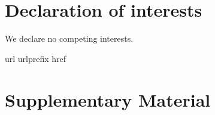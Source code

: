\documentclass[preprint,10pt]{elsarticle} %
\newcommand{\beginsupplement}{%
        \setcounter{table}{0}
        \renewcommand{\thetable}{S\arabic{table}}%
        \setcounter{figure}{0}
        \renewcommand{\thefigure}{S\arabic{figure}}%
     }
\begin{document}
\section*{Declaration of interests}\label{sec:dec}
We declare no competing interests.



 
%
\expandafter\ifx\csname url\endcsname\relax
  \def\url#1{\texttt{#1}}\fi
\expandafter\ifx\csname urlprefix\endcsname\relax\def\urlprefix{URL }\fi
\expandafter\ifx\csname href\endcsname\relax
  \def\href#1#2{#2} \def\path#1{#1}\fi



\section{Supplementary Material}
\beginsupplement
\end{document}
